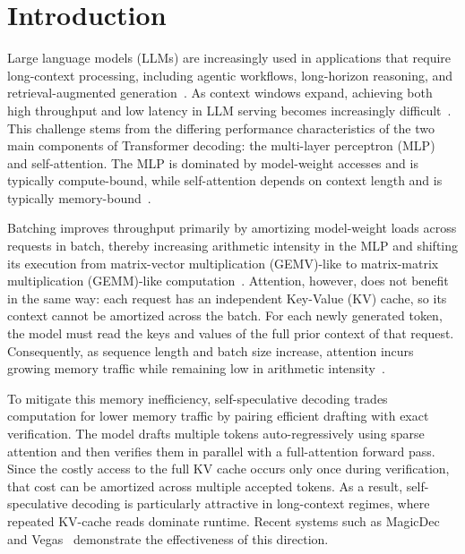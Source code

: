 \section{Introduction}
Large language models (LLMs) are increasingly used in applications that require long-context processing, including agentic workflows, long-horizon reasoning, and retrieval-augmented generation~\citep{openai2025gpt5, deepmind2025gemini3pro, yang2025qwen3}. As context windows expand, achieving both high throughput and low latency in LLM serving becomes increasingly difficult~\citep{liu2025comprehensive}. This challenge stems from the differing performance characteristics of the two main components of Transformer decoding: the multi-layer perceptron (MLP) and self-attention. The MLP is dominated by model-weight accesses and is typically compute-bound, while self-attention depends on context length and is typically memory-bound~\citep{tang2024quest}.

Batching improves throughput primarily by amortizing model-weight loads across requests in batch, thereby increasing arithmetic intensity in the MLP and shifting its execution from matrix-vector multiplication (GEMV)-like to matrix-matrix multiplication (GEMM)-like computation~\citep{kwon2023efficient, agrawal2024taming, zheng2024sglang}. Attention, however, does not benefit in the same way: each request has an independent Key-Value (KV) cache, so its context cannot be amortized across the batch. For each newly generated token, the model must read the keys and values of the full prior context of that request. Consequently, as sequence length and batch size increase, attention incurs growing memory traffic while remaining low in arithmetic intensity~\citep{agrawal2024vidur}.

To mitigate this memory inefficiency, self-speculative decoding trades computation for lower memory traffic by pairing efficient drafting with exact verification. The model drafts multiple tokens auto-regressively using sparse attention and then verifies them in parallel with a full-attention forward pass. Since the costly access to the full KV cache occurs only once during verification, that cost can be amortized across multiple accepted tokens. As a result, self-speculative decoding is particularly attractive in long-context regimes, where repeated KV-cache reads dominate runtime. Recent systems such as MagicDec~\citep{sadhukhan2025magicdec} and Vegas~\citep{yue2026vegas} demonstrate the effectiveness of this direction.

